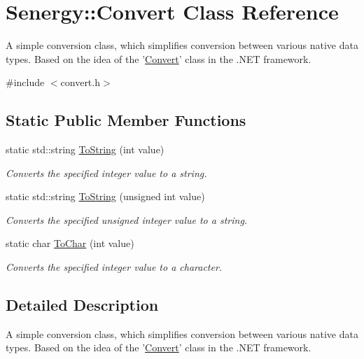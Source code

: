 \hypertarget{class_senergy_1_1_convert}{\section{Senergy\-:\-:Convert Class Reference}
\label{class_senergy_1_1_convert}
}


A simple conversion class, which simplifies conversion between various native data types. Based on the idea of the '\hyperlink{class_senergy_1_1_convert}{Convert}' class in the .N\-E\-T framework.  




{\ttfamily \#include $<$convert.\-h$>$}

\subsection*{Static Public Member Functions}
\begin{DoxyCompactItemize}
\item 
static std\-::string \hyperlink{class_senergy_1_1_convert_a80cf7b84b0ff65171da68ca40cbf817f}{To\-String} (int value)
\begin{DoxyCompactList}\small\item\em Converts the specified integer value to a string. \end{DoxyCompactList}\item 
static std\-::string \hyperlink{class_senergy_1_1_convert_ac468bf5d893e3437883763d8457adc1c}{To\-String} (unsigned int value)
\begin{DoxyCompactList}\small\item\em Converts the specified unsigned integer value to a string. \end{DoxyCompactList}\item 
static char \hyperlink{class_senergy_1_1_convert_a66c09e2b461268212cc384e71a2f57c6}{To\-Char} (int value)
\begin{DoxyCompactList}\small\item\em Converts the specified integer value to a character. \end{DoxyCompactList}\end{DoxyCompactItemize}


\subsection{Detailed Description}
A simple conversion class, which simplifies conversion between various native data types. Based on the idea of the '\hyperlink{class_senergy_1_1_convert}{Convert}' class in the .N\-E\-T framework. 

